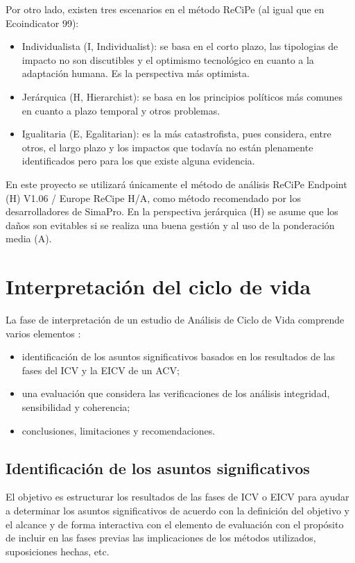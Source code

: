 Por otro lado, existen tres escenarios en el método ReCiPe (al igual que en Ecoindicator 99):

\begin{itemize}
  \item Individualista (I, Individualist): se basa en el corto plazo, las tipologias de impacto no son discutibles y el optimismo tecnológico en cuanto a la adaptación humana. Es la perspectiva más optimista.
  \item Jerárquica (H, Hierarchist): se basa en los principios políticos más comunes en cuanto a plazo temporal y otros problemas.
  \item Igualitaria (E, Egalitarian): es la más catastrofista, pues considera, entre otros, el largo plazo y los impactos que todavía no están plenamente identificados pero para los que existe alguna evidencia.
\end{itemize}

En este proyecto se utilizará únicamente el método de análisis ReCiPe Endpoint (H) V1.06 / Europe ReCipe H/A, como método recomendado por los desarrolladores de SimaPro. En la perspectiva jerárquica (H) se asume que los daños son evitables si se realiza una buena gestión y al uso de la ponderación media (A).

\section{Interpretación del ciclo de vida}

La fase de interpretación de un estudio de Análisis de Ciclo de Vida comprende varios elementos \cite{iso14044}:
\begin{itemize}
  \item identificación de los asuntos significativos basados en los resultados de las fases del ICV y la EICV de un ACV;
  \item una evaluación que considera las verificaciones de los análisis integridad, sensibilidad y coherencia;
  \item conclusiones, limitaciones y recomendaciones.
\end{itemize}

\subsection{Identificación de los asuntos significativos}

El objetivo es estructurar los resultados de las fases de ICV o EICV para ayudar a determinar los asuntos significativos de acuerdo con la definición del objetivo y el alcance y de forma interactiva con el elemento de evaluación con el propósito de incluir en las fases previas las implicaciones de los métodos utilizados, suposiciones hechas, etc.

